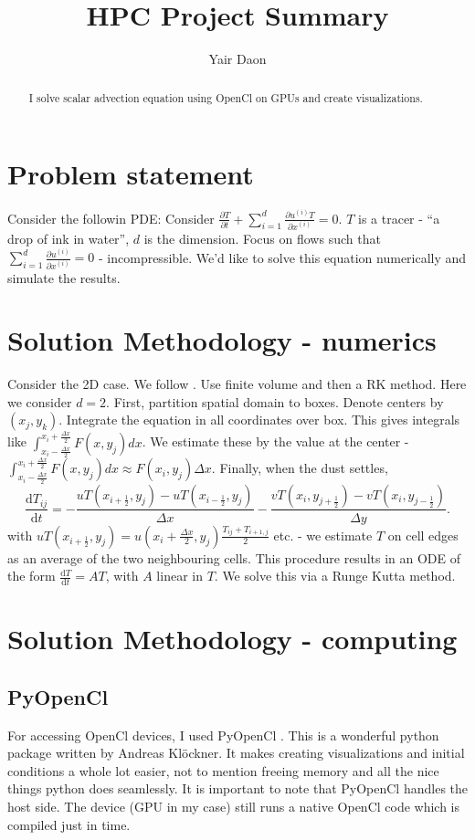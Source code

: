 \documentclass[paper=a4, fontsize=11pt]{scrartcl} %
\title{HPC Project Summary}
\author{Yair Daon}
\date{}
\numberwithin{equation}{section} %
\numberwithin{figure}{section} %
\numberwithin{table}{section} %
\newcommand{\der}{\text{d}}
\begin{document}
\maketitle
\begin{abstract}
I solve scalar advection equation using OpenCl on GPUs and create visualizations.
\end{abstract}
\section{Problem statement}
Consider the followin PDE:
Consider $\frac{\partial T}{\partial t} + \sum_{i=1}^{d} \frac{\partial u^{(i)}T}{\partial x^{(i)}} = 0$.
$T$ is a tracer - ``a drop of ink in water'', $d$ is the dimension. Focus on flows such that $\sum_{i=1}^{d} \frac{\partial u^{(i)}}{\partial x^{(i)}} = 0$ - incompressible.
We'd like to solve this equation numerically and simulate the results.



\section{Solution Methodology - numerics}
Consider the 2D case. We follow \cite{terrorist}. 
Use finite volume and then a RK method. Here we consider $d=2$. First, partition spatial domain to boxes. Denote centers by $(x_j, y_k)$.
Integrate the equation in all coordinates over box.  This gives integrals like 
$\int_{x_i - \frac{\Delta x}{2}}^{x_i + \frac{\Delta x}{2}} F(x,y_j) dx$. We estimate these by
the value at the center - $\int_{x_i - \frac{\Delta x}{2}}^{x_i + \frac{\Delta x}{2}} F(x,y_j) dx \approx F(x_i ,y_j)\Delta x$.
Finally, when the dust settles, 
  $$
  \frac{\der T_{ij}}{\der t} = -\frac{uT(x_{i+\frac{1}{2}} , y_j) - uT(x_{i-\frac{1}{2}} , y_j)}{\Delta x} -\frac{vT(x_i , y_{j+\frac{1}{2}}) - vT(x_i , y_{j-\frac{1}{2}})}{\Delta y}.
$$
with $uT(x_{i+\frac{1}{2}} , y_j)= u(x_i + \frac{\Delta x}{2},y_j) \frac{T_{ij} + T_{i+1,j}}{2}$ etc. - we estimate $T$ on cell edges as 
an average of the two neighbouring cells. This procedure results in an ODE of the form $\frac{\der T}{\der t} = AT$, with $A$ linear in $T$. We solve this
via a Runge Kutta method.

\section{Solution Methodology - computing}

\subsection{PyOpenCl}
For accessing OpenCl devices, I used PyOpenCl \cite{pyopencl}. This is a wonderful python package written by Andreas Kl\"ockner. 
It makes creating visualizations and initial conditions a whole lot easier, not to 
mention freeing memory and all the nice things python does seamlessly. It is important to note that PyOpenCl handles the host side. 
The device (GPU in my case) still runs a native OpenCl code which is 
compiled just in time.
\end{document}
